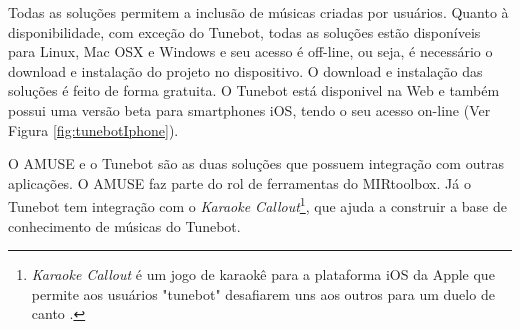 Todas as soluções permitem a inclusão de músicas criadas por usuários. Quanto à disponibilidade, com exceção do Tunebot, todas as soluções estão disponíveis para Linux, Mac OSX e Windows e seu acesso é off-line, ou seja, é necessário o download e instalação do projeto no dispositivo. O download e instalação das soluções é feito de forma gratuita. O Tunebot está disponivel na Web e também possui uma versão beta para smartphones iOS, tendo o seu acesso on-line (Ver Figura \ref{fig:tunebotIphone}).

O AMUSE e o Tunebot são as duas soluções que possuem integração com outras aplicações. O AMUSE faz parte do rol de ferramentas do MIRtoolbox. Já o Tunebot tem integração com o \textit{Karaoke Callout}\footnote{\textit{Karaoke Callout} é um jogo de karaokê para a plataforma iOS da Apple que permite aos usuários "tunebot" desafiarem uns aos outros para um duelo de canto \cite{karaokeCallout2006}.}, que ajuda a construir a base de conhecimento de músicas do Tunebot.

